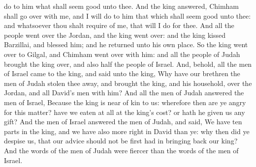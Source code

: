 do to him what shall seem good unto thee. And the king answered, Chimham shall go over with me, and I will do to him that which shall seem good unto thee: and whatsoever thou shalt require of me, that will I do for thee. And all the people went over the Jordan, and the king went over: and the king kissed Barzillai, and blessed him; and he returned unto his own place.  So the king went over to Gilgal, and Chimham went over with him: and all the people of Judah brought the king over, and also half the people of Israel. And, behold, all the men of Israel came to the king, and said unto the king, Why have our brethren the men of Judah stolen thee away, and brought the king, and his household, over the Jordan, and all David’s men with him? And all the men of Judah answered the men of Israel, Because the king is near of kin to us: wherefore then are ye angry for this matter? have we eaten at all at the king’s cost? or hath he given us any gift? And the men of Israel answered the men of Judah, and said, We have ten parts in the king, and we have also more right in David than ye: why then did ye despise us, that our advice should not be first had in bringing back our king? And the words of the men of Judah were fiercer than the words of the men of Israel. 

